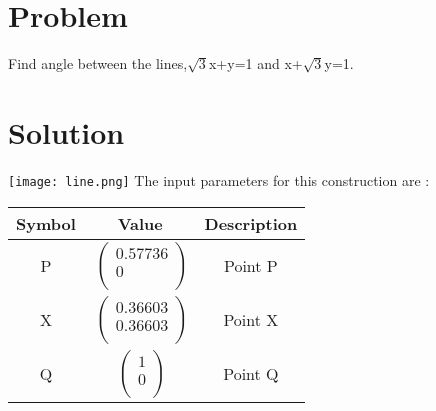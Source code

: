 \documentclass[10pt, a4paper]{article}
\title{\mytitle}
\author{\myauthor\hspace{1em}\\\contact\\IITH\hspace{0.5em}-\hspace{0.5em}\mymodule}
\date{}
\begin{document}
	\maketitle
\section*{Problem}
   Find angle between the lines,$\sqrt{3}$x+y=1 and x+$\sqrt{3}$y=1.
   \section*{Solution}
   \texttt{[image: line.png]}
   The input parameters for this construction are :
   \begin{center}
\begin{tabular}{|c|c|c|}
	\hline
	\textbf{Symbol}&\textbf{Value}&\textbf{Description}\\
	\hline
	P&$\
	\begin{pmatrix}
		0.57736 \\
		0 \\
	\end{pmatrix}$%
	&Point P\\ 
	\hline
	X&$\
	\begin{pmatrix}
		0.36603 \\
		0.36603 \\
	\end{pmatrix}$%
	&Point X\\
	\hline
	Q&$\
	\begin{pmatrix}
		1 \\
		0 \\
	\end{pmatrix}$%
	&Point Q\\
	
	\hline
\end{tabular}
\end{center}
\end{document}
